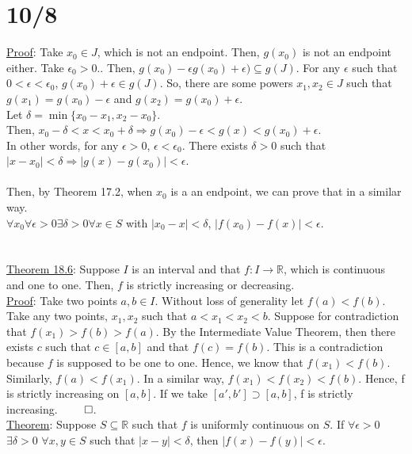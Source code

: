\documentclass[11pt]{article}
\begin{document}
\section*{10/8}
	\underline{Proof}: Take $x_0 \in J$, which is not an endpoint. Then, 
	$g(x_0)$ is not an endpoint either. Take $\epsilon_0 > 0.$. Then, $g(x_0) 
	- \epsilon g(x_0) + \epsilon) \subseteq g(J)$.
	For any $\epsilon$ such that $0 < \epsilon < \epsilon_0$, $g(x_0) + 
	\epsilon \in g(J)$. So, there are some powers $x_1, x_2 \in J$ such that
	$g(x_1) = g(x_0) - \epsilon$ and $g(x_2) = g(x_0) + \epsilon$. \\
	Let $\delta = \min\{x_0 - x_1, x_2 - x_0\}$.\\
	Then, $x_0 - \delta < x < x_0 + \delta \Rightarrow g(x_0) - \epsilon < 
	g(x) <g(x_0) + \epsilon$.\\
	In other words, for any $\epsilon > 0$, $\epsilon < \epsilon_0$. There 
	exists $\delta > 0$ such that $|x - x_0| < \delta \Rightarrow |g(x) -
	g(x_0)| < \epsilon$. \\\\
	Then, by Theorem 17.2, when $x_0$ is a an endpoint, 
	we can prove that in a similar way.\\
	$\forall x_0 \forall \epsilon > 0 \exists \delta > 0 \forall x \in S$ with
	$|x_0 - x| < \delta$, $|f(x_0) - f(x)| < \epsilon$.\\\\\\
	\underline{Theorem 18.6}:
		Suppose $I$ is an interval and that $f: I \rightarrow \mathbb{R}$, which
		is continuous and one to one. Then, $f$ is strictly increasing or 
		decreasing.\\
	\underline{Proof}: Take two points $a, b \in I$. Without loss of generality
		let $f(a) < f(b)$. Take any two points, $x_1, x_2$ such that $a < x_1 <
		x_2 < b$. Suppose for contradiction that $f(x_1) > f(b) > f(a)$. By
		the Intermediate Value Theorem, then there exists $c$ such that
		$c \in [a,b]$ and that $f(c) = f(b)$. This is a contradiction
		because $f$ is supposed to be one to one. Hence, we know that $f(x_1) < 
		f(b)$. Similarly, $f(a) < f(x_1)$. In a similar way, $f(x_1) < f(x_2) <
		f(b)$. Hence, f is strictly increasing on $[a,b]$. If we take $[a',b']
		\supset [a,b]$, f is strictly increasing. $\qed$.\\
	\underline{Theorem}:
		Suppose $ S \subseteq \mathbb{R}$ such that $f$ is uniformly continuous
		on $S$. If $\forall \epsilon > 0$ $\exists \delta > 0$ $\forall x,y \in 
		S$ such 
		that $|x - y|< \delta$, then $|f(x) - f(y)| < \epsilon$.\\
\end{document}
